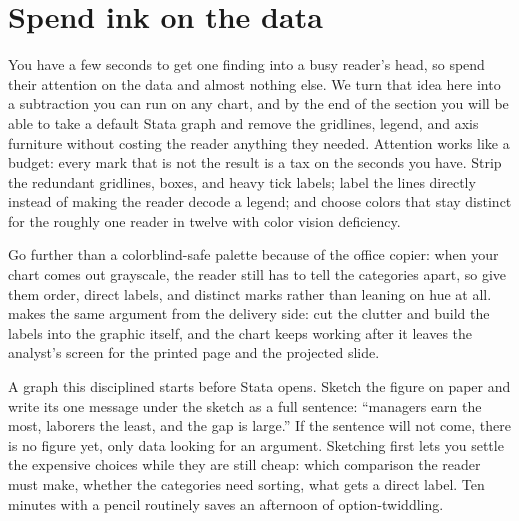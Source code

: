 \section{Spend ink on the data}
You have a few seconds to get one finding into a busy reader's head, so spend their attention on the data and almost nothing else. We turn that idea here into a subtraction you can run on any chart, and by the end of the section you will be able to take a default Stata graph and remove the gridlines, legend, and axis furniture without costing the reader anything they needed. Attention works like a budget: every mark that is not the result is a tax on the seconds you have. Strip the redundant gridlines, boxes, and heavy tick labels; label the lines directly instead of making the reader decode a legend; and choose colors that stay distinct for the roughly one reader in twelve with color vision deficiency.

Go further than a colorblind-safe palette because of the office copier: when your chart comes out grayscale, the reader still has to tell the categories apart, so give them order, direct labels, and distinct marks rather than leaning on hue at all. \textcite{schwabish2014economist} makes the same argument from the delivery side: cut the clutter and build the labels into the graphic itself, and the chart keeps working after it leaves the analyst's screen for the printed page and the projected slide.

A graph this disciplined starts before Stata opens. Sketch the figure on paper and write its one message under the sketch as a full sentence: \enquote{managers earn the most, laborers the least, and the gap is large.} If the sentence will not come, there is no figure yet, only data looking for an argument. Sketching first lets you settle the expensive choices while they are still cheap: which comparison the reader must make, whether the categories need sorting, what gets a direct label. Ten minutes with a pencil routinely saves an afternoon of option-twiddling.

